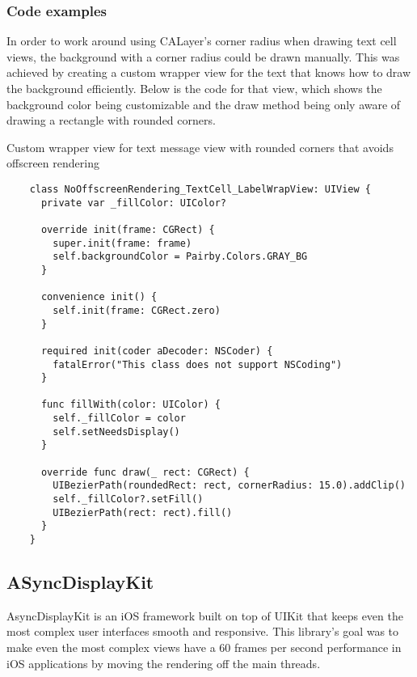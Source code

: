 \documentclass[a4paper,12pt]{article}
\begin{document}
\subsubsection*{Code examples}
In order to work around using CALayer's corner radius when drawing text cell views, the background with a corner radius could be drawn manually. This was achieved by creating a custom wrapper view for the text that knows how to draw the background efficiently. Below is the code for that view, which shows the background color being customizable and the draw method being only aware of drawing a rectangle with rounded corners.
\begin{listing}[H]
  \caption{Custom wrapper view for text message view with rounded corners that avoids offscreen rendering}
  \begin{verbatim}
    class NoOffscreenRendering_TextCell_LabelWrapView: UIView {
      private var _fillColor: UIColor?

      override init(frame: CGRect) {
        super.init(frame: frame)
        self.backgroundColor = Pairby.Colors.GRAY_BG
      }

      convenience init() {
        self.init(frame: CGRect.zero)
      }

      required init(coder aDecoder: NSCoder) {
        fatalError("This class does not support NSCoding")
      }

      func fillWith(color: UIColor) {
        self._fillColor = color
        self.setNeedsDisplay()
      }

      override func draw(_ rect: CGRect) {
        UIBezierPath(roundedRect: rect, cornerRadius: 15.0).addClip()
        self._fillColor?.setFill()
        UIBezierPath(rect: rect).fill()
      }
    }
  \end{verbatim}
\end{listing}


\subsection{ASyncDisplayKit}
AsyncDisplayKit is an iOS framework built on top of UIKit that keeps even the most complex user interfaces smooth and responsive.\cite{IntroducingAsyncDisplayKit} This library's goal was to make even the most complex views have a 60 frames per second performance in iOS applications by moving the rendering off the main threads.
\end{document}

